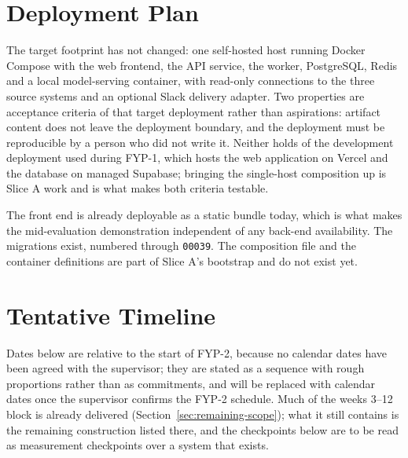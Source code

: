 \section{Deployment Plan}
\label{sec:deployment-plan}

The target footprint has not changed: one self-hosted host running Docker Compose
with the web frontend, the API service, the worker, PostgreSQL, Redis and a local
model-serving container, with read-only connections to the three source systems
and an optional Slack delivery adapter. Two properties are acceptance criteria
of that target deployment rather than aspirations: artifact content does not
leave the deployment boundary, and the deployment must be reproducible by a
person who did not write it. Neither holds of the development deployment used
during FYP-1, which hosts the web application on Vercel and the database on
managed Supabase; bringing the single-host composition up is Slice A work and is
what makes both criteria testable.

The front end is already deployable as a static bundle today, which is what
makes the mid-evaluation demonstration independent of any back-end availability.
The migrations exist, numbered through \texttt{00039}. The composition file and
the container definitions are part of Slice A's bootstrap and do not exist yet.

\section{Tentative Timeline}
\label{sec:timeline}

Dates below are relative to the start of FYP-2, because no calendar dates have
been agreed with the supervisor; they are stated as a sequence with rough
proportions rather than as commitments, and will be replaced with calendar
dates once the supervisor confirms the FYP-2 schedule. Much of the weeks 3--12
block is already delivered (Section~\ref{sec:remaining-scope}); what it still
contains is the remaining construction listed there, and the checkpoints below
are to be read as measurement checkpoints over a system that exists.

